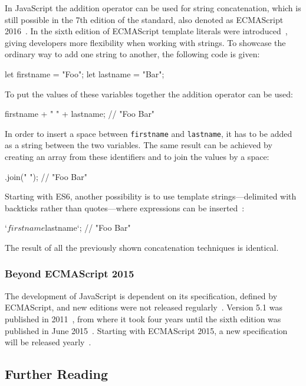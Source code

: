 In JavaScript the addition operator can be used for string concatenation, which is still possible in the 7th edition of the standard, also denoted as ECMAScript 2016~\cite{ES2016SpecOnline:Ecma:2016}. In the sixth edition of ECMAScript template literals were introduced~\cites[p.~148]{ES6Spec:Ecma:2015}[pp.~47--48]{YDKJS:ES6AndBeyond:Simpson:2015}, giving developers more flexibility when working with strings. To showcase the ordinary way to add one string to another, the following code is given:
\begin{JsCode}[numbers=none]
let firstname = "Foo";
let lastname = "Bar";
\end{JsCode}
To put the values of these variables together the addition operator can be used:
\begin{JsCode}[numbers=none]
firstname + " " + lastname; // "Foo Bar"
\end{JsCode}
In order to insert a space between \texttt{firstname} and \texttt{lastname}, it has to be added as a string between the two variables. The same result can be achieved by creating an array from these identifiers and to join the values by a space:
\begin{JsCode}.join(" "); // "Foo Bar"
\end{JsCode}
Starting with ES6, another possibility is to use template strings---delimited with backticks rather than quotes---where expressions can be inserted~\cite[p.~48]{YDKJS:ES6AndBeyond:Simpson:2015}:
\begin{JsCode}[numbers=none]
`${firstname} ${lastname}`; // "Foo Bar"
\end{JsCode}
The result of all the previously shown concatenation techniques is identical.

\subsubsection{Beyond ECMAScript 2015}

The development of JavaScript is dependent on its specification, defined by ECMAScript, and new editions were not released regularly~\cite{ECMA262Archive:Ecma}. Version 5.1 was published in 2011~\cite{ESSpecOnline:Ecma:2011}, from where it took four years until the sixth edition was published in June 2015~\cite{ES2015SpecOnline:Ecma:2015}. Starting with ECMAScript 2015, a new specification will be released yearly~\cite{ECMAScriptNextSupportInMozilla:Mozilla:2017}.

\subsection{Further Reading}
\label{sec:further reading}

